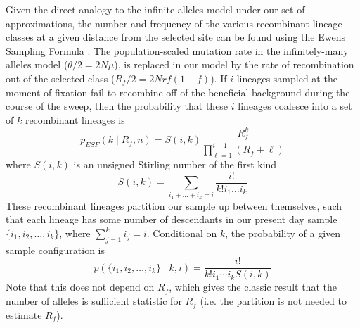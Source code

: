 \documentclass[a4paper,10pt]{article}
\begin{document}
Given the direct analogy to the infinite alleles model under our set of approximations, the number and frequency of the various recombinant lineage classes at a given distance from the selected site can be found using the Ewens Sampling Formula \citep{Ewens1972}. The population-scaled mutation rate in the infinitely-many alleles model ($\theta/2=2N\mu$), is replaced in our model by the rate of recombination out of the selected class ($R_{f}/2=2Nrf(1-f)$). If $i$ lineages sampled at the moment of fixation fail to recombine off of the beneficial background during the course of the sweep, then the probability that these $i$ lineages coalesce into a set of $k$ recombinant lineages is 
\begin{equation}
	p_{ESF}(k \mid R_f,n)  = S(i,k) \frac{R_f^k}{ \prod_{\ell=1}^{i-1} (R_f +\ell) }  \label{ESF1}
\end{equation}
where $S(i,k)$ is an unsigned Stirling number of the first kind
\begin{equation}
	S(i,k) = \sum_{i_1 + \dots + i_k = i} \frac{i!}{k!i_1\dots i_k}
\end{equation}
These recombinant lineages partition our sample up between themselves, such that each lineage has some number of descendants in our present day sample $\{i_1,i_2,\dots,i_k\}$, where $\sum_{j=1}^k i_j =i$. Conditional on $k$, the probability of a given sample configuration is
\begin{equation}
	p(\{i_1,i_2,\dots,i_k\} \mid k,i) = \frac{i!}{k! i_1\cdots i_k S(i,k)}  \label{ESF2}
\end{equation}
Note that this does not depend on $R_f$, which gives the classic result that the number of alleles is sufficient statistic for $R_f$ (i.e. the partition is not needed to estimate $R_f$).
\end{document}
